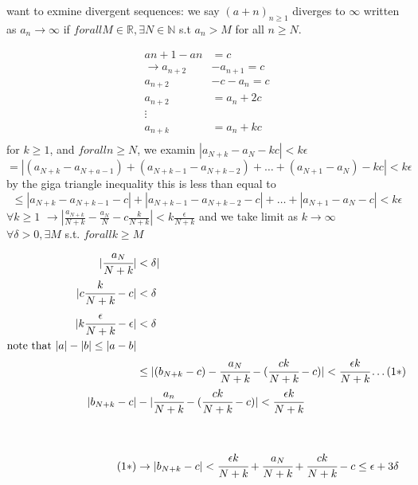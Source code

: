 \documentclass{article}
\begin{document}
 
want to exmine divergent sequences: we say $(a+n)_{n \geq 1}$ diverges to $\infty$ written as $a_n \rightarrow \infty$ if $forall M \in \mathbb{R}, \exists N \in \mathbb{N}$ s.t $a_n > M$ for all $n \geq N$.
\begin{proofbox}
    \begin{align*}
        a{n+1} -an &= c \\
        \rightarrow a_{n+2} &- a_{n+1} = c \\
        a_{n+2} &- c - a_{n} = c \\  
        a_{n+2} &=  a_{n}+ 2c \\
        \vdots \\ 
        a_{n+k} &= a_{n} + kc \\
    \end{align*}
    for $k \geq 1$, and $forall n \geq N$,
    we examin $|a_{N+k} - a_N - kc| < k\epsilon$ 
    $$= |(a_{N +k} - a_{N + a - 1}) + (a_{N + k - 1} - a_{N + k - 2}) + \dots + (a_{N + 1} - a_N) - kc| < k\epsilon$$ 
    by the giga triangle inequality this is less than equal to $$\leq |a_{N+k} - a_{N+k - 1} - c| + |a_{N+k - 1} - a_{N+k - 2} - c| + \dots + |a_{N+1} - a_N - c| < k\epsilon$$
    $\forall k \geq 1$ $\longrightarrow |\frac{a_{N+k}}{N+k} - \frac{a_N}{N} - c\frac{k}{N+k}| < k\frac{\epsilon}{N+k}$ and we take limit as $k \to \infty$
    \\
    $\forall \delta > 0, \exists M$ s.t. $forall k \geq M$ 
    \begin{align*}
        |\cfrac{a_N}{N + k} |&< \delta| \\ 
        |c \cfrac{k}{N + k} - c| &< \delta \\ 
        |k \cfrac{\epsilon}{N + k} - \epsilon| &< \delta \\ 
        \text{note that $|a| - |b| \leq |a-b|$} \\ 
        &\leq |(b_{N+k} - c) - \cfrac{a_N}{N+k} - (\cfrac{ck}{N +k} -c )| < \cfrac{\epsilon k}{N + k }  \hdots (1*) \\ 
        |b_{N+k} - c| &- |\cfrac{a_n}{N + k} - (\cfrac{ck}{N + k} - c)| < \cfrac{\epsilon k}{N + k} \\  \\ \\ 
        (1*) &\rightarrow |b_{N+k} - c| < \cfrac{\epsilon k}{N + k} + \cfrac{a_N}{N + k} + \cfrac{ck}{N + k} - c  \leq \epsilon + 3\delta\\
    \end{align*}
\end{proofbox}
\end{document}
